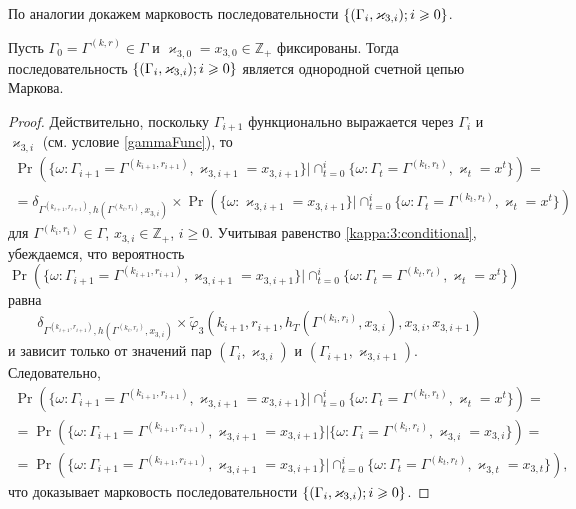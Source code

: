 \documentclass[a4paper,12pt,russian]{extarticle}
\newcommand{\MarkThree}{\{(\Gamma_i, \varkappa_{3,i}); \hm{} i \geqslant 0\}}
\begin{document}
По аналогии докажем марковость последовательности $\MarkThree$.
\begin{theorem}
Пусть $\Gamma_0=\Gamma^{(k,r)}\in \Gamma$ и $\varkappa_{3,0}=x_{3,0}\in \mathbb{Z}_+$ фиксированы. Тогда последовательность $\MarkThree$ является однородной счетной цепью Маркова.
\end{theorem}
\begin{proof}
Действительно, поскольку $\Gamma_{i+1}$ функционально выражается через $\Gamma_i$ и $\varkappa_{3,i}$ (см. условие \eqref{gammaFunc}), то
\begin{multline*}
\Pr (\{ \omega\colon \Gamma_{i+1} =\Gamma^{(k_{i+1},r_{i+1})},\varkappa_{3,i+1} = x_{3,i+1}\} |\cap_{t=0}^{i}\{\omega\colon  \Gamma_t=\Gamma^{(k_t,r_t)}, \varkappa_t=x^t\})=\\
=\delta_{\Gamma^{(k_{i+1},r_{i+1})},h(\Gamma^{(k_i,r_i)},x_{3,i})}\times \Pr (\{ \omega\colon  \varkappa_{3,i+1} = x_{3,i+1}\} |\cap_{t=0}^{i}\{\omega\colon  \Gamma_t=\Gamma^{(k_t,r_t)}, \varkappa_t=x^t\})
\end{multline*}
для $\Gamma^{(k_i,r_i)}\in \Gamma$, $x_{3,i}\in {\mathbb Z}_+$, $i\geqslant 0$. Учитывая равенство \eqref{kappa:3:conditional}, убеждаемся, что вероятность 
$$
\Pr (\{\omega\colon  \Gamma_{i+1} =\Gamma^{(k_{i+1},r_{i+1})},\varkappa_{3,i+1} = x_{3,i+1}\} |\cap_{t=0}^{i}\{\omega\colon \Gamma_t=\Gamma^{(k_t,r_t)}, \varkappa_t=x^t\}) 
$$ 
равна
$$
\delta_{\Gamma^{(k_{i+1},r_{i+1})},h(\Gamma^{(k_i,r_i)},x_{3,i})} \times \widetilde{\varphi}_3(k_{i+1},r_{i+1},h_T(\Gamma^{(k_i,r_i)},x_{3,i}),x_{3,i},x_{3,i+1})
$$
и зависит только от значений пар $(\Gamma_i,\varkappa_{3,i})$ и $(\Gamma_{i+1},\varkappa_{3,i+1})$. Следовательно, 
\begin{multline*}
\Pr (\{ \omega\colon \Gamma_{i+1} =\Gamma^{(k_{i+1},r_{i+1})},\varkappa_{3,i+1} = x_{3,i+1}\} |\cap_{t=0}^{i}\{\omega\colon \Gamma_t=\Gamma^{(k_t,r_t)}, \varkappa_t=x^t\})=\\
=\Pr (\{\omega\colon   \Gamma_{i+1} =\Gamma^{(k_{i+1},r_{i+1})},\varkappa_{3,i+1} = x_{3,i+1}\} |\{\omega\colon  \Gamma_i=\Gamma^{(k_i,r_i)}, \varkappa_{3,i}=x_{3,i}\}) = \\
=\Pr (\{\omega\colon \Gamma_{i+1} =\Gamma^{(k_{i+1},r_{i+1})},\varkappa_{3,i+1} = x_{3,i+1}\} |\cap_{t=0}^{i}\{ \omega\colon \Gamma_t=\Gamma^{(k_t,r_t)}, \varkappa_{3,t}=x_{3,t}\}),
\end{multline*}
что доказывает марковость последовательности $\MarkThree$.
\end{proof}
\end{document}
